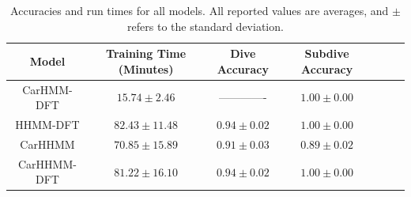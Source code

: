 

\begin{table}[h]
\centering
\caption{Accuracies and run times for all models. All reported values are averages, and $\pm$ refers to the standard deviation.}
\begin{tabular}{ccccccc}
Model       & \multicolumn{1}{c}{Training Time (Minutes)} & \multicolumn{1}{c}{Dive Accuracy} & \multicolumn{1}{c}{Subdive Accuracy}  \\ \hline
CarHMM-DFT  & $15.74 \pm 2.46$                            & -------------                     & $1.00 \pm 0.00$                       \\ 
HHMM-DFT    & $82.43 \pm 11.48$                           & $0.94 \pm 0.02$                   & $1.00 \pm 0.00$                       \\
CarHHMM     & $70.85 \pm 15.89$                           & $0.91 \pm 0.03$                   & $0.89 \pm 0.02$                       \\
CarHHMM-DFT & $81.22 \pm 16.10$                           & $0.94 \pm 0.02$                   & $1.00 \pm 0.00$                       \\
\end{tabular}
\label{table:accuracy}
\end{table}


